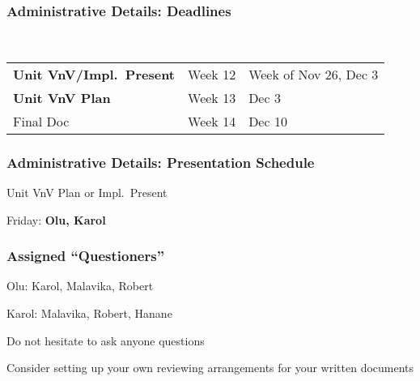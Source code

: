 \documentclass[t,12pt,numbers,fleqn]{beamer}
\begin{document}



\begin{frame}
\frametitle{Administrative Details: Deadlines}
~\newline
\begin{tabular}{l l l}
\textbf{Unit VnV/Impl.\ Present} & Week 12 & Week of Nov 26, Dec 3\\
\textbf{Unit VnV Plan} & Week 13 & Dec 3\\
Final Doc & Week 14 & Dec 10\\
\end {tabular}

\end{frame}


\begin{frame}
\frametitle{Administrative Details: Presentation Schedule}

\bi
\item Unit VnV Plan or Impl.\ Present
\bi
\item Friday: \textbf{Olu, Karol}
\ei
\ei

\end{frame}


\begin{frame}
\frametitle{Assigned ``Questioners''}

\be
 \item Olu: Karol, Malavika, Robert
 \item Karol: Malavika, Robert, Hanane
\ee
\bi
\item Do not hesitate to ask anyone questions
\item Consider setting up your own reviewing arrangements for your written
  documents
\ei
\end{frame}

\end{document}
